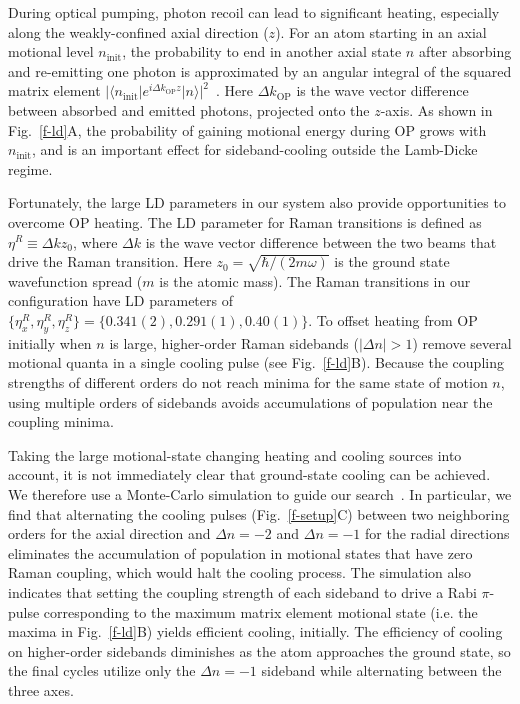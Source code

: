 \documentclass[aps,prl,twocolumn,groupedaddress]{revtex4-1}
\begin{document}
During optical pumping, photon recoil can lead to significant heating,
especially along the weakly-confined axial direction ($z$).
For an atom starting in an axial motional level $n_{\textrm{init}}$,
the probability to end in another axial state $n$ after absorbing and
re-emitting one photon is approximated by an angular integral of the squared matrix element
$|\langle n_{\textrm{init}}|e^{i \Delta k_{\textrm{OP}} z}| n\rangle|^2$~\cite{ItanoWineland1979}.
Here $\Delta k_{\textrm{OP}}$ is the wave vector difference between absorbed and emitted photons,
projected onto the $z$-axis.
As shown in Fig.~\ref{f-ld}A,
the probability of gaining motional energy during OP grows with $n_{\textrm{init}}$,
and is an important effect for sideband-cooling outside the Lamb-Dicke regime.

Fortunately, the large LD parameters in our system also provide opportunities to overcome OP heating.
The LD parameter for Raman transitions is defined as $\eta^R\equiv\Delta k z_0$,
where $\Delta k$ is the wave vector difference
between the two beams that drive the Raman transition.
Here $z_0=\sqrt{\hbar/(2 m \omega)}$ is the ground state wavefunction spread
($m$ is the atomic mass).
The Raman transitions in our configuration have LD parameters of
$\{\eta^R_x,\eta^R_y,\eta^R_z\} = \{0.341(2), 0.291(1), 0.40(1)\}$.
To offset heating from OP initially when $n$ is large, higher-order Raman sidebands
($|\Delta n| > 1$) remove several motional quanta in a single cooling pulse (see Fig.~\ref{f-ld}B).
Because the coupling strengths of different orders do not reach minima
for the same state of motion $n$,
using multiple orders of sidebands avoids accumulations of population
near the coupling minima.

Taking the large motional-state changing heating and cooling sources into account,
it is not immediately clear that ground-state cooling can be achieved.
We therefore use a Monte-Carlo simulation to guide our search~\cite{Dalibard1992}.
In particular, we find that alternating the cooling pulses (Fig.~\ref{f-setup}C) between two
neighboring orders for the axial direction and $\Delta n=-2$ and $\Delta n=-1$
for the radial directions
eliminates the accumulation of population in motional states that have zero Raman coupling,
which would halt the cooling process.
The simulation also indicates that setting the coupling strength of each sideband
to drive a Rabi $\pi$-pulse corresponding to the maximum matrix element motional state
(i.e. the maxima in Fig.~\ref{f-ld}B)  yields efficient cooling, initially.
The efficiency of cooling on higher-order sidebands diminishes
as the atom approaches the ground state, so the final cycles utilize only
the $\Delta n=-1$ sideband while alternating between the three axes.
\end{document}
